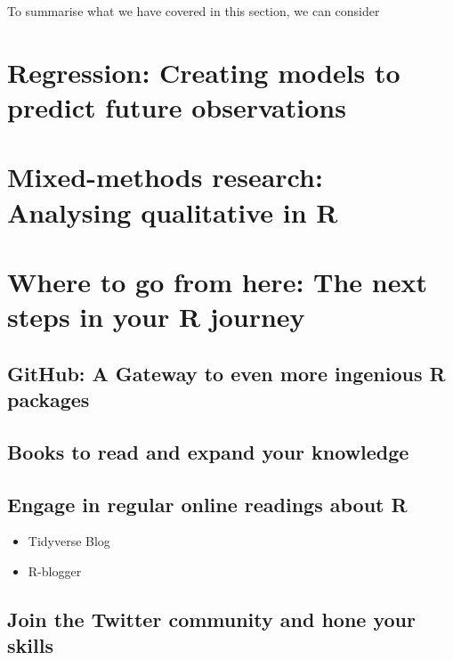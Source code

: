 \documentclass[
]{book}
\providecommand{\tightlist}{%
  \setlength{\itemsep}{0pt}\setlength{\parskip}{0pt}}
\begin{document}
To summarise what we have covered in this section, we can consider

\hypertarget{regression}{%
\chapter{Regression: Creating models to predict future observations}\label{regression}}

\hypertarget{mixed-methods-research-analysing-qualitative-in-r}{%
\chapter{Mixed-methods research: Analysing qualitative in R}\label{mixed-methods-research-analysing-qualitative-in-r}}

\hypertarget{next-steps}{%
\chapter{Where to go from here: The next steps in your R journey}\label{next-steps}}

\hypertarget{next-steps-github}{%
\section{GitHub: A Gateway to even more ingenious R packages}\label{next-steps-github}}

\hypertarget{next-steps-books}{%
\section{Books to read and expand your knowledge}\label{next-steps-books}}

\hypertarget{next-steps-online-readings}{%
\section{Engage in regular online readings about R}\label{next-steps-online-readings}}

\begin{itemize}
\tightlist
\item
  Tidyverse Blog
\item
  R-blogger
\end{itemize}

\hypertarget{next-steps-twitter}{%
\section{Join the Twitter community and hone your skills}\label{next-steps-twitter}}
\end{document}
